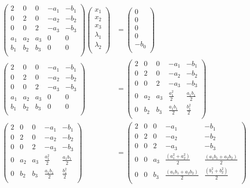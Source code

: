 \documentclass[letterpaper]{article}
\renewcommand{\l}{\lambda}
\renewcommand{\*}{\cdot}
\theoremstyle{definition}
\begin{document}
\begin{align*}
	\begin{pmatrix}
	2 & 0 & 0 & -a_1 & -b_1\\
	0 & 2 & 0 & -a_2 & -b_2\\
	0 & 0 & 2 & -a_3 & -b_3\\
	a_1 & a_2 & a_3 & 0 & 0\\
	b_1 & b_2 & b_3 & 0 & 0\\
	\end{pmatrix}\begin{pmatrix}
	x_1\\
	x_2\\
	x_3\\
	\l_1\\
	\l_2\\
	\end{pmatrix} &= \begin{pmatrix}
	0\\
	0\\
	0\\
	0\\
	-b_0\\
	\end{pmatrix}\\%
	\begin{pmatrix}
	2 & 0 & 0 & -a_1 & -b_1\\
	0 & 2 & 0 & -a_2 & -b_2\\
	0 & 0 & 2 & -a_3 & -b_3\\
	a_1 & a_2 & a_3 & 0 & 0\\
	b_1 & b_2 & b_3 & 0 & 0\\
	\end{pmatrix} &= 	\begin{pmatrix}
	2 & 0 & 0 & -a_1 & -b_1\\
	0 & 2 & 0 & -a_2 & -b_2\\
	0 & 0 & 2 & -a_3 & -b_3\\
	0 & a_2 & a_3 & \frac{a_1^2}{2} & \frac{a_1b_1}{2}\\
	0 & b_2 & b_3 & \frac{a_1b_1}{2} & \frac{b_1^2}{2}\\
	\end{pmatrix}\\ %
	\begin{pmatrix}
	2 & 0 & 0 & -a_1 & -b_1\\
	0 & 2 & 0 & -a_2 & -b_2\\
	0 & 0 & 2 & -a_3 & -b_3\\
	0 & a_2 & a_3 & \frac{a_1^2}{2} & \frac{a_1b_1}{2}\\
	0 & b_2 & b_3 & \frac{a_1b_1}{2} & \frac{b_1^2}{2}\\
	\end{pmatrix} &= \begin{pmatrix}
	2 & 0 & 0 & -a_1 & -b_1\\
	0 & 2 & 0 & -a_2 & -b_2\\
	0 & 0 & 2 & -a_3 & -b_3\\
	0 & 0 & a_3 & \frac{(a_1^2 + a_2^2)}{2} & \frac{(a_1b_1 + a_2b_2)}{2}\\
	0 & 0 & b_3 & \frac{(a_1b_1 + a_2b_2)}{2} & \frac{(b_1^2 + b_2^2)}{2}\\
	\end{pmatrix}
\end{align*}
\end{document}
